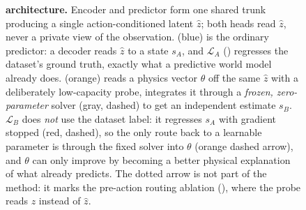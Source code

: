 \begin{figure}[t]
{%
}
\caption{\textbf{\method architecture.} Encoder and predictor form one
shared trunk producing a single action-conditioned latent $\hat z$; both
heads read $\hat z$, never a private view of the observation. \pathA
(blue) is the ordinary predictor: a decoder reads $\hat z$ to a state
$s_A$, and $\mathcal L_A$ () regresses the dataset's
ground truth, exactly what a predictive world model already does.
\pathB (orange) reads a physics vector $\theta$ off the same $\hat z$
with a deliberately low-capacity probe, integrates it through a
\emph{frozen, zero-parameter} solver (gray, dashed) to get an
independent estimate $s_B$. $\mathcal L_B$ does \emph{not} use the
dataset label: it regresses $s_A$ with gradient stopped (red, dashed),
so the only route back to a learnable parameter is through the fixed
solver into $\theta$ (orange dashed arrow), and $\theta$ can only
improve by becoming a better physical explanation of what \pathA
already predicts. The dotted arrow is not part of the method: it marks
the pre-action routing ablation (), where the
probe reads $z$ instead of $\hat z$.}
\label{fig:architecture}
\end{figure}
